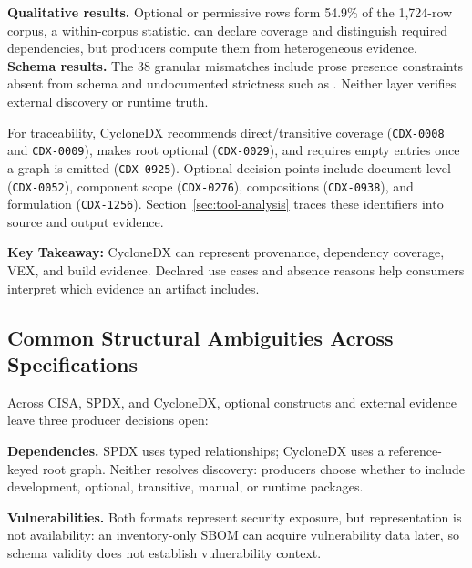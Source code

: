 

\textbf{Qualitative results.} Optional or permissive rows form 54.9\% of the 1,724-row corpus, a within-corpus statistic.  can declare coverage and  distinguish required dependencies, but producers compute them from heterogeneous evidence. \textbf{Schema results.} The 38 granular mismatches include prose presence constraints absent from schema and undocumented strictness such as . Neither layer verifies external discovery or runtime truth.

For traceability, CycloneDX recommends direct/transitive coverage (\texttt{CDX-0008} and \texttt{CDX-0009}), makes root  optional (\texttt{CDX-0029}), and requires empty entries once a graph is emitted (\texttt{CDX-0925}). Optional decision points include document-level  (\texttt{CDX-0052}), component scope (\texttt{CDX-0276}), compositions (\texttt{CDX-0938}), and formulation (\texttt{CDX-1256}). Section~\ref{sec:tool-analysis} traces these identifiers into source and output evidence.

\begin{tcolorbox}[colback=gray!4!white, colframe=black!80, boxrule=0.5pt, arc=5pt, left=2pt, right=2pt, top=1pt, bottom=1pt]
\textbf{Key Takeaway:} CycloneDX can represent provenance, dependency coverage, VEX, and build evidence. Declared use cases and absence reasons help consumers interpret which evidence an artifact includes.
\end{tcolorbox}

\subsection{Common Structural Ambiguities Across Specifications}
Across CISA, SPDX, and CycloneDX, optional constructs and external evidence leave three producer decisions open:

\textbf{Dependencies.} SPDX uses typed relationships; CycloneDX uses a reference-keyed root graph. Neither resolves discovery: producers choose whether to include development, optional, transitive, manual, or runtime packages.

\textbf{Vulnerabilities.} Both formats represent security exposure, but representation is not availability: an inventory-only SBOM can acquire vulnerability data later, so schema validity does not establish vulnerability context.

